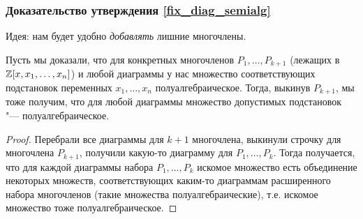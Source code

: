 \subsubsection{Доказательство утверждения \ref{fix_diag_semialg}}	
	Идея: нам будет удобно \textit{добавлять} лишние многочлены.
	\begin{assertion}
		Пусть мы доказали, что для конкретных многочленов $P_1, \dots, P_{k+1}$ (лежащих в $\mathbb{Z}[x, x_1, \dots, x_n]$) и любой диаграммы
		у нас множество соответствующих подстановок переменных $x_1, \dots, x_n$ полуалгебраическое.
		Тогда, выкинув $P_{k+1}$, мы тоже получим, что для любой диаграммы множество допустимых подстановок "--- полуалгебраическое.
	\end{assertion}
	\begin{proof}
		Перебрали все диаграммы для $k+1$ многочлена, выкинули строчку для многочлена $P_{k+1}$, получили какую-то диаграмму для $P_1, \dots, P_k$.
		Тогда получается, что для каждой диаграммы набора $P_1, \dots, P_k$ искомое множество есть объединение некоторых множеств,
		соответствующих каким-то диаграммам расширенного набора многочленов (такие множества полуалгебраические), т.е.
		искомое множество тоже полуалгебраическое.
	\end{proof}


